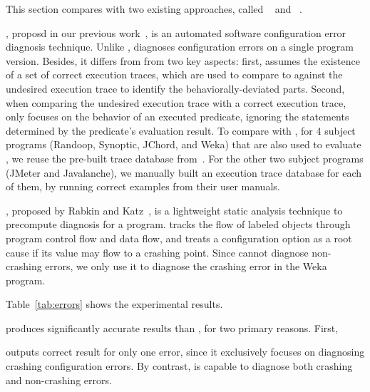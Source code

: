 This section compares \ourtool with two existing approaches,
called \prevtool~\cite{Zhang:2013:ADS} and \conftool~\cite{Rabkin:2011:PPC}.

\prevtool, proposd in our previous work~\cite{}, is an automated
software configuration error diagnosis technique. Unlike \ourtool,
\prevtool diagnoses configuration errors on a single program version.
Besides, it differs from \ourtool from two key aspects:
first, \prevtool assumes the existence of a set of correct execution
traces, which are used to compare to against the undesired
execution trace to identify the behaviorally-deviated parts.
Second, when comparing the undesired execution trace with a
correct execution trace, \prevtool only focuses on the behavior
of an executed predicate, ignoring the statements determined
by the predicate's evaluation result. To compare \ourtool with
\prevtool, for 4 subject programs (Randoop, Synoptic, JChord, and
Weka) that are also used
to evaluate \prevtool, we reuse the pre-built trace database
from~\cite{}. For the other two subject programs (JMeter and
Javalanche), we manually built an execution trace database for each
of them, by running correct examples from their user manuals.

\conftool, proposed by Rabkin and Katz~\cite{}, is a lightweight
static analysis technique to precompute diagnosis for a program.
\conftool tracks the flow of labeled objects through 
program control flow and data flow, and treats a configuration option
as a root cause if its value may flow to a crashing point.
Since \conftool cannot diagnose non-crashing errors, we only use
it to diagnose the crashing error in the Weka program.



Table~\ref{tab:errors} shows the experimental results.

\ourtool produces significantly accurate results than \prevtool,
for two primary reasons. First,

\conftool outputs correct result for only one error, since
it exclusively focuses on diagnosing crashing configuration errors.
By contrast, \ourtool is capable to diagnose both crashing
and non-crashing errors.

